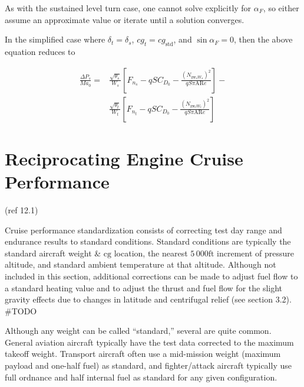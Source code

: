 \documentclass[
]{book}
\begin{document}
As with the sustained level turn case, one cannot solve explicitly for
\(\alpha_F\), so either assume an approximate value or iterate until a solution
converges.

In the simplified case where \(\delta_t = \delta_s\), \(cg_t = cg_{\text{std}}\),
and \(\sin \alpha_F = 0\), then the above equation reduces to

\begin{align}
\frac{\Delta P_s}{M a_0} =
      &\frac{\sqrt{\theta_s}}{W_s}
      \left[
            F_{n_s} - qSC_{D_0} -
            \frac{\left(
                        N_{\text{zw}_s W_s}
                  \right)^2}{
                  qS\pi \mathrm{AR} e      
                  }
      \right] - \\
      &\frac{\sqrt{\theta_t}}{W_t}
      \left[
            F_{n_t} - qSC_{D_0} -
            \frac{\left(
                        N_{\text{zw}_t W_t}
                  \right)^2}{
                  qS\pi \mathrm{AR} e      
                  }
      \right]
\label{eq:delta-p-sub-s}
\end{align}

\hypertarget{reciprocating-engine-cruise-performance}{%
\section{Reciprocating Engine Cruise Performance}\label{reciprocating-engine-cruise-performance}}

(ref 12.1)

Cruise performance standardization consists of correcting test day range and
endurance results to standard conditions. Standard conditions are typically the
standard aircraft weight \& \(\mathrm{cg}\) location, the nearest
\(5\,000 \text{ft}\) increment of pressure altitude, and standard ambient
temperature at that altitude. Although not included in this section, additional
corrections can be made to adjust fuel flow to a standard heating value and to
adjust the thrust and fuel flow for the slight gravity effects due to changes
in latitude and centrifugal relief (see section 3.2). \#TODO

Although any weight can be called ``standard,'' several are quite common. General
aviation aircraft typically have the test data corrected to the maximum takeoff
weight. Transport aircraft often use a mid-mission weight (maximum payload and
one-half fuel) as standard, and fighter/attack aircraft typically use full
ordnance and half internal fuel as standard for any given configuration.
\end{document}
